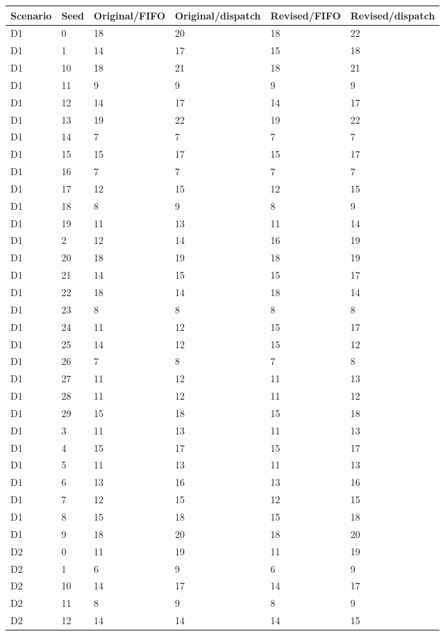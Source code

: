 \begin{longtable}{llllll}
\toprule
Scenario & Seed & Original/FIFO & Original/dispatch & Revised/FIFO & Revised/dispatch \\
\midrule
\endhead
D1 & 0 & 18 & 20 & 18 & 22 \\
D1 & 1 & 14 & 17 & 15 & 18 \\
D1 & 10 & 18 & 21 & 18 & 21 \\
D1 & 11 & 9 & 9 & 9 & 9 \\
D1 & 12 & 14 & 17 & 14 & 17 \\
D1 & 13 & 19 & 22 & 19 & 22 \\
D1 & 14 & 7 & 7 & 7 & 7 \\
D1 & 15 & 15 & 17 & 15 & 17 \\
D1 & 16 & 7 & 7 & 7 & 7 \\
D1 & 17 & 12 & 15 & 12 & 15 \\
D1 & 18 & 8 & 9 & 8 & 9 \\
D1 & 19 & 11 & 13 & 11 & 14 \\
D1 & 2 & 12 & 14 & 16 & 19 \\
D1 & 20 & 18 & 19 & 18 & 19 \\
D1 & 21 & 14 & 15 & 15 & 17 \\
D1 & 22 & 18 & 14 & 18 & 14 \\
D1 & 23 & 8 & 8 & 8 & 8 \\
D1 & 24 & 11 & 12 & 15 & 17 \\
D1 & 25 & 14 & 12 & 15 & 12 \\
D1 & 26 & 7 & 8 & 7 & 8 \\
D1 & 27 & 11 & 12 & 11 & 13 \\
D1 & 28 & 11 & 12 & 11 & 12 \\
D1 & 29 & 15 & 18 & 15 & 18 \\
D1 & 3 & 11 & 13 & 11 & 13 \\
D1 & 4 & 15 & 17 & 15 & 17 \\
D1 & 5 & 11 & 13 & 11 & 13 \\
D1 & 6 & 13 & 16 & 13 & 16 \\
D1 & 7 & 12 & 15 & 12 & 15 \\
D1 & 8 & 15 & 18 & 15 & 18 \\
D1 & 9 & 18 & 20 & 18 & 20 \\
D2 & 0 & 11 & 19 & 11 & 19 \\
D2 & 1 & 6 & 9 & 6 & 9 \\
D2 & 10 & 14 & 17 & 14 & 17 \\
D2 & 11 & 8 & 9 & 8 & 9 \\
D2 & 12 & 14 & 14 & 14 & 15 \\

\end{longtable}
